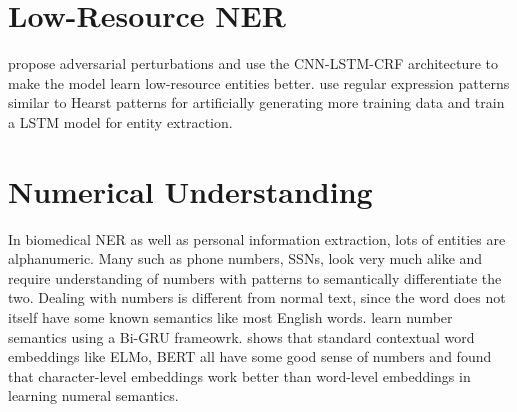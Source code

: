 \section{Low-Resource NER}
\cite{zhou2019dual} propose adversarial perturbations and use the CNN-LSTM-CRF architecture to make the model learn low-resource entities better. \cite{arora2017extracting} use regular expression patterns similar to Hearst patterns for artificially generating more training data and train a LSTM model for entity extraction.

\section{Numerical Understanding}
In biomedical NER as well as personal information extraction, lots of entities are alphanumeric. Many such as phone numbers, SSNs, look very much alike and require understanding of numbers with patterns to semantically differentiate the two. Dealing with numbers is different from normal text, since the word does not itself have some known semantics like most English words. \cite{chen2019numeracy} learn number semantics using a Bi-GRU frameowrk. \cite{wallace2019nlp} shows that standard contextual word embeddings like ELMo\cite{peters2018deep}, BERT\cite{devlin2018bert} all have some good sense of numbers and found that character-level embeddings work better than word-level embeddings in learning numeral semantics.
